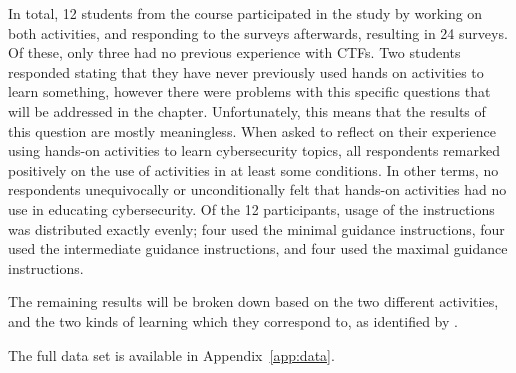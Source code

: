 In total, 12 students from the course participated in the study by working on both activities, and responding to the surveys afterwards, resulting in 24 surveys. Of these, only three had no previous experience with CTFs. Two students responded stating that they have never previously used hands on activities to learn something, however there were problems with this specific questions that will be addressed in the  chapter. Unfortunately, this means that the results of this question are mostly meaningless. When asked to reflect on their experience using hands-on activities to learn cybersecurity topics, all respondents remarked positively on the use of activities in at least some conditions. In other terms, no respondents unequivocally or unconditionally felt that hands-on activities had no use in educating cybersecurity. Of the 12 participants, usage of the instructions was distributed exactly evenly; four used the minimal guidance instructions, four used the intermediate guidance instructions, and four used the maximal guidance instructions. 

The remaining results will be broken down based on the two different activities, and the two kinds of learning which they correspond to, as identified by \textcite{R-Weiss}. 

The full data set is available in Appendix~\ref{app:data}.

    
        

